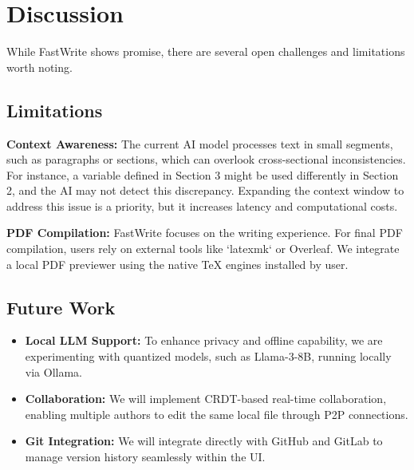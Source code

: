 \section{Discussion}
While FastWrite shows promise, there are several open challenges and limitations worth noting.
\subsection{Limitations}

\textbf{Context Awareness:} The current AI model processes text in small segments, such as paragraphs or sections, which can overlook cross-sectional inconsistencies.
For instance, a variable defined in Section 3 might be used differently in Section 2, and the AI may not detect this discrepancy.
Expanding the context window to address this issue is a priority, but it increases latency and computational costs.

\textbf{PDF Compilation:} FastWrite focuses on the writing experience.
For final PDF compilation, users rely on external tools like `latexmk` or Overleaf.
We integrate a local PDF previewer using the native TeX engines installed by user.

\subsection{Future Work}
\begin{itemize}
    \item \textbf{Local LLM Support:} To enhance privacy and offline capability, we are experimenting with quantized models, such as Llama-3-8B, running locally via Ollama.
    \item \textbf{Collaboration:} We will implement CRDT-based real-time collaboration, enabling multiple authors to edit the same local file through P2P connections.
    \item \textbf{Git Integration:} We will integrate directly with GitHub and GitLab to manage version history seamlessly within the UI.
\end{itemize}
